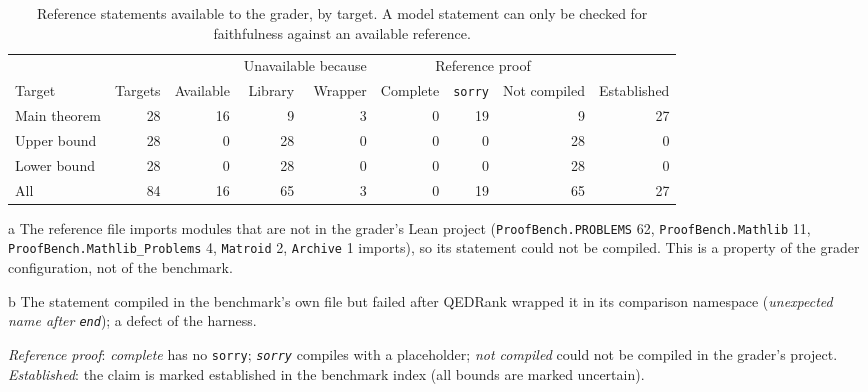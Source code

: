 \documentclass[11pt]{article}
\begin{document}
\begin{table}[!htbp]
\centering
\begin{threeparttable}
\caption{Reference statements available to the grader, by target. A model statement can only be checked for faithfulness against an available reference.}
\label{tab:f-refs}
\small
\setlength{\tabcolsep}{4.5pt}
\begin{tabular}{@{}lrrrrrrrr@{}}
\toprule
 & & & \multicolumn{2}{c}{Unavailable because} & \multicolumn{3}{c}{Reference proof} & \\
\cmidrule(lr){4-5}\cmidrule(lr){6-8}
Target & Targets & Available & Library\tnote{a} & Wrapper\tnote{b} & Complete & \texttt{sorry} & Not compiled & Established \\
\midrule
Main theorem & 28 & 16 & 9 & 3 & 0 & 19 & 9 & 27 \\
Upper bound & 28 & 0 & 28 & 0 & 0 & 0 & 28 & 0 \\
Lower bound & 28 & 0 & 28 & 0 & 0 & 0 & 28 & 0 \\
\midrule
All & 84 & 16 & 65 & 3 & 0 & 19 & 65 & 27 \\
\bottomrule
\end{tabular}
\begin{tablenotes}\footnotesize
\item[a] The reference file imports modules that are not in the grader's Lean project (\texttt{ProofBench.PROBLEMS} 62, \texttt{ProofBench.Mathlib} 11, \texttt{ProofBench.Mathlib\_Problems} 4, \texttt{Matroid} 2, \texttt{Archive} 1 imports), so its statement could not be compiled. This is a property of the grader configuration, not of the benchmark.
\item[b] The statement compiled in the benchmark's own file but failed after QEDRank wrapped it in its comparison namespace (\textit{unexpected name after \texttt{end}}); a defect of the harness.
\item[] \textit{Reference proof}: \emph{complete} has no \texttt{sorry}; \emph{\texttt{sorry}} compiles with a placeholder; \emph{not compiled} could not be compiled in the grader's project. \emph{Established}: the claim is marked established in the benchmark index (all bounds are marked uncertain).
\end{tablenotes}
\end{threeparttable}
\end{table}
\end{document}
